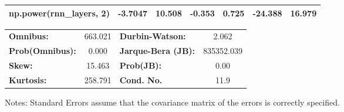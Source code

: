 \begin{center}
\begin{tabular}{lcccccc}
\textbf{np.power(rnn\_layers, 2)}         &      -3.7047  &       10.508     &    -0.353  &         0.725        &      -24.388    &       16.979     \\
\bottomrule
\end{tabular}
\begin{tabular}{lclc}
\textbf{Omnibus:}       & 663.021 & \textbf{  Durbin-Watson:     } &     2.062   \\
\textbf{Prob(Omnibus):} &   0.000 & \textbf{  Jarque-Bera (JB):  } & 835352.039  \\
\textbf{Skew:}          &  15.463 & \textbf{  Prob(JB):          } &      0.00   \\
\textbf{Kurtosis:}      & 258.791 & \textbf{  Cond. No.          } &      11.9   \\
\bottomrule
\end{tabular}
\end{center}

Notes: \newline
 [1] Standard Errors assume that the covariance matrix of the errors is correctly specified.